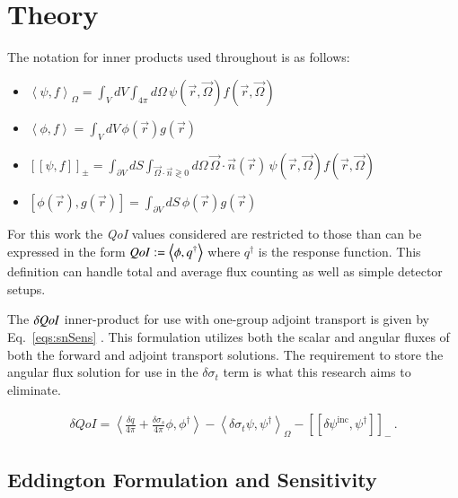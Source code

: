 \documentclass{anstrans}
\newcommand{\vr}{\vec{r}}
\newcommand{\vO}{\vec{\Omega}}
\newcommand{\bra}{\left\langle}
\newcommand{\ket}{\right\rangle}
\newcommand{\braSN}{\left\langle}
\newcommand{\ketSN}{\right\rangle_{\Omega}}
\newcommand{\sbraSN}{\left[ \! \left[}
\newcommand{\sketSN}{\right] \! \right]}
\newcommand{\sbra}{\left[}
\newcommand{\sket}{\right]}
\newcommand{\bound}{\partial V}
\newcommand{\vn}{\vec{n}}
\newcommand{\sigt}{\sigma_t}
\newcommand{\sigs}{\sigma_s}
\newcommand{\angSourced}{\frac{\delta q}{4 \pi}}
\newcommand{\qoi}{{\it QoI}\xspace}
\begin{document}
\section{Theory}
The notation for inner products used throughout is as follows:
\begin{itemize}
\item $\braSN \psi , f \ketSN  = \int_V dV \int_{4 \pi} d \Omega \,  \psi(\vr, \vO)f(\vr, \vO) \,$

\item $\bra \phi , f \ket  = \int_V dV \,  \phi(\vr) g(\vr) \,$

\item $\sbraSN \psi , f \sketSN_{\pm}   = \int_{\bound} dS \int_{\vO \cdot \vn \gtrless 0} d\Omega \,  \vO \cdot \vn(\vr) \, \psi(\vr, \vO)f(\vr, \vO) \,$

\item $\sbra \phi(\vr) , g(\vr)  \sket = \int_{\partial V} dS \, \phi (\vr) g (\vr)  \,$
\end{itemize}

For this work the \qoi values considered are restricted to those than can be expressed in the form $\qoi := \bra \phi , q^\dag \ket $ where $q^\dag$ is the response function. This definition can handle total and average flux counting as well as simple detector setups.

The $\delta \qoi$ inner-product for use with one-group adjoint transport is given by Eq.~\eqref{eqs:snSens} \cite{Greenspan}. This formulation utilizes both the scalar and angular fluxes of both the forward and adjoint transport solutions. The requirement to store the angular flux solution for use in the $\delta \sigt$ term is what this research aims to eliminate.

\begin{equation}
\label{eqs:snSens}
\begin{split}
\delta QoI = \bra \angSourced  + \frac{\delta\sigs}{4 \pi} \phi , \phi^\dag  \ket - \braSN  \delta \sigt \psi , \psi^\dag \ketSN - \sbraSN \delta \psi^{\text{inc}}, \psi^\dag \sketSN_- \,.
\end{split}
\end{equation}

\subsection{Eddington Formulation and Sensitivity}
\end{document}
